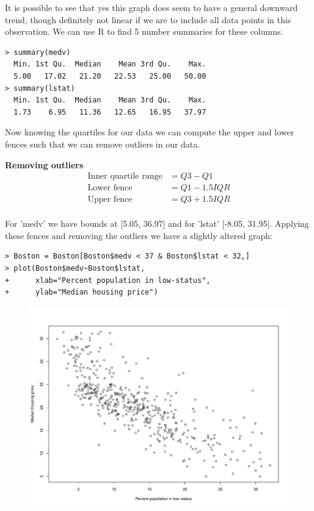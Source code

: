 \documentclass{article}
\begin{document}
It is possible to see that yes this graph does seem to have a general downward 
trend, though definitely not linear if we are to include all data points in 
this observation. We can use R to find 5 number summaries for these columns.

\begin{verbatim}
> summary(medv)
  Min. 1st Qu.  Median    Mean 3rd Qu.    Max. 
  5.00   17.02   21.20   22.53   25.00   50.00 
> summary(lstat)
  Min. 1st Qu.  Median    Mean 3rd Qu.    Max. 
  1.73    6.95   11.36   12.65   16.95   37.97 
\end{verbatim}

Now knowing the quartiles for our data we can compute the upper and lower fences
such that we can remove outliers in our data.

\pagebreak

{\large \bf Removing outliers}\\
\begin{align*}
  \text{Inner quartile range} &= Q3 - Q1    \\
  \text{Lower fence} &= Q1 - 1.5IQR         \\
  \text{Upper fence} &= Q3 + 1.5IQR         \\
\end{align*}

For 'medv' we have bounds at [5.05, 36.97] and for 'lstat' [-8.05, 31.95].
Applying these fences and removing the outliers we have a slightly altered graph:

\begin{verbatim}
> Boston = Boston[Boston$medv < 37 & Boston$lstat < 32,]
> plot(Boston$medv~Boston$lstat, 
+      xlab="Percent population in low-status",
+      ylab="Median housing price")
\end{verbatim}

\begin{figure}[!ht]
  \centering
  \includegraphics[width=0.65\linewidth]{plots/medv-vs-lstat-rm-outliers.pdf}
\end{figure}
\end{document}
